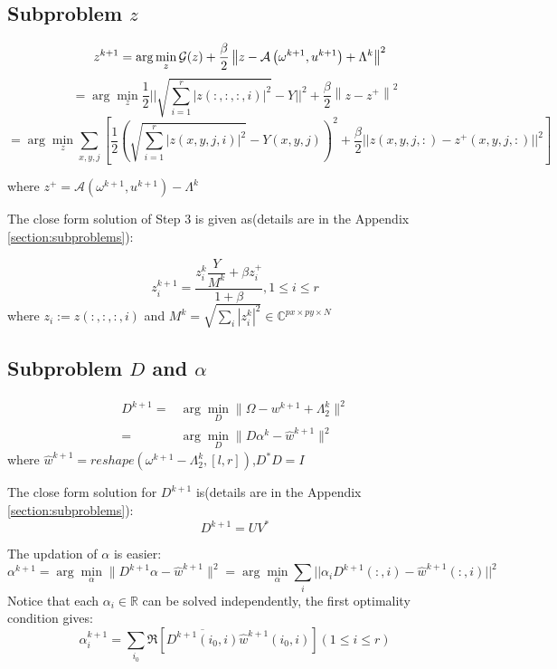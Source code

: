 \documentclass{article}
\numberwithin{equation}{section}
\begin{document}
\subsection{Subproblem $z$}
$$
 \quad z^{k+1}=\arg \min _{z} \mathcal{G}(z)+\frac{\beta}{2}\left\|z-\mathcal{A}\left(\omega^{k+1}, u^{k+1}\right)+\Lambda^{k}\right\|^{2}\\
 $$
 $$
 =\arg \min _{z} \frac{1}{2}|| \sqrt{ \sum_{i=1}^{r} |z(:,:,:,i)|^2} - Y||^2+\frac{\beta}{2}\left\|z - z^+\right\|^{2}
$$
$$
= \arg \min _{z} \sum_{x,y,j} [\frac{1}{2} ( \sqrt{ \sum_{i=1}^{r} |z(x,y,j,i)|^2} - Y(x,y,j) )^2 +
 \frac{\beta}{2}||z(x,y,j,:) - z^+(x,y,j,:)||^2 ]
$$

where $z^+ = \mathcal{A}\left(\omega^{k+1}, u^{k+1}\right) - \Lambda^{k}$


The  close form solution of Step 3 is given as(details are in the Appendix \ref{section:subproblems}):

\begin{equation}
z_i^{k+1} = \dfrac{z_i^k \dfrac{Y}{ M^k} + \beta z_i^+}{1+\beta}, 1 \leq i \leq r
\label{zup}
\end{equation}
where $z_i:= z(:,:,:,i)$ and $M^k =\sqrt{\sum_i |z_i^k|^2} \in \mathbb{C}^{px \times py \times N}$


\subsection{Subproblem $D$ and $\alpha$} 
$$
\begin{aligned}
D^{k+1} =& \arg \min_{D} \| \Omega -  w^{k+1} + \Lambda_2^{k}\|^{2} \\
=& \arg \min_{D} \| D\alpha^k - \hat {w}^{k+1}\|^{2} 
\end{aligned}
$$
where $\hat {w}^{k+1} = reshape( \omega^{k+1} - \Lambda_2^{k},[l,r])$,$D^*D=I$

The close form solution for $D^{k+1}$ is(details are in the Appendix \ref{section:subproblems}):
\begin{equation}
D^{k+1} = UV^*
\label{Dup}
\end{equation}

The updation of $\alpha$ is easier:
$$
\alpha^{k+1} = \arg \min_{\alpha} \| D^{k+1}\alpha - \hat {w}^{k+1}\|^{2} 
= \arg \min_{\alpha} \sum_i ||\alpha_i D^{k+1}(:,i) - \hat {w}^{k+1}(:,i)||^2
$$
Notice that each $\alpha_i \in \mathbb{R}$ can be solved independently, the first optimality condition gives:
\begin{equation}
\label{alpha up}
\alpha_i^{k+1} =  \sum_{i_0} \Re[ \overline{D^{k+1}(i_0,i)} \hat {w}^{k+1}(i_0,i) ]
(1\leq i \leq r)
\end{equation}
\end{document}
